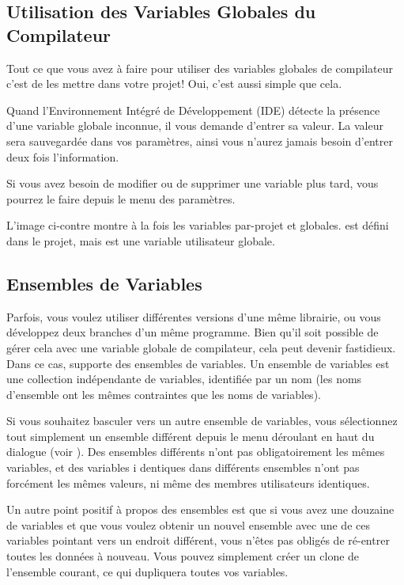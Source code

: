 \subsection{Utilisation des Variables Globales du Compilateur}

Tout ce que vous avez à faire pour utiliser des variables globales de compilateur c'est de les mettre dans votre projet! Oui, c'est aussi simple que cela.

Quand l'Environnement Intégré de Développement (IDE) détecte la présence d'une variable globale inconnue, il vous demande d'entrer sa valeur. La valeur sera sauvegardée dans vos paramètres, ainsi vous n'aurez jamais besoin d'entrer deux fois l'information.

Si vous avez besoin de modifier ou de supprimer une variable plus tard, vous pourrez le faire depuis le menu des paramètres.




L'image ci-contre montre à la fois les variables par-projet et globales.  est défini dans le projet, mais  est une variable utilisateur globale.

\subsection{Ensembles de Variables}

Parfois, vous voulez utiliser différentes versions d'une même librairie, ou vous développez deux branches d’un même programme. Bien qu'il soit possible de gérer cela avec une variable globale de compilateur, cela peut devenir fastidieux. Dans ce cas, \codeblocks supporte des ensembles de variables. Un ensemble de variables est une collection indépendante de variables, identifiée par un nom (les noms d'ensemble ont les mêmes contraintes que les noms de variables).

Si vous souhaitez basculer vers un autre ensemble de variables, vous sélectionnez tout simplement un ensemble différent depuis le menu déroulant en haut du dialogue (voir ). Des ensembles différents n'ont pas obligatoirement les mêmes variables, et des variables i dentiques dans différents ensembles n'ont pas forcément les mêmes valeurs, ni même des membres utilisateurs identiques.

Un autre point positif à propos des ensembles est que si vous avez une douzaine de variables et que vous voulez obtenir un nouvel ensemble avec une de ces variables pointant vers un endroit différent, vous n'êtes pas obligés de ré-entrer toutes les données à nouveau. Vous pouvez simplement créer un clone de l'ensemble courant, ce qui dupliquera toutes vos variables.

